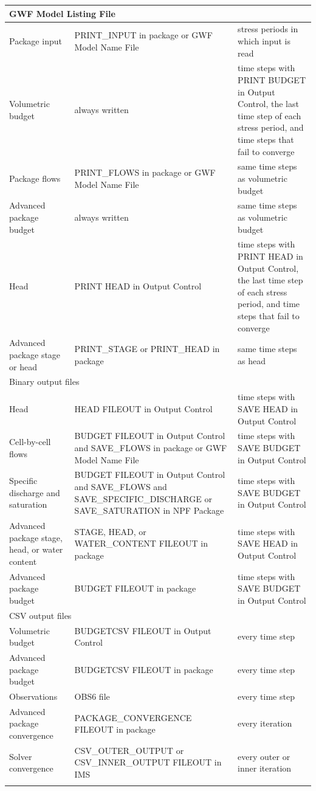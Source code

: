 \begin{longtable}{p{4.5cm} p{5cm} p{5.5cm}}
\multicolumn{3}{l}{GWF Model Listing File} \\
\hline
Package input & PRINT\_INPUT in package or GWF Model Name File & stress periods in which input is read \\
Volumetric budget & always written & time steps with PRINT BUDGET in Output Control, the last time step of each stress period, and time steps that fail to converge \\
Package flows & PRINT\_FLOWS in package or GWF Model Name File & same time steps as volumetric budget \\
Advanced package budget & always written & same time steps as volumetric budget \\
Head & PRINT HEAD in Output Control & time steps with PRINT HEAD in Output Control, the last time step of each stress period, and time steps that fail to converge \\
Advanced package stage or head & PRINT\_STAGE or PRINT\_HEAD in package & same time steps as head \\
\hline
\multicolumn{3}{l}{Binary output files} \\
\hline
Head & HEAD FILEOUT in Output Control & time steps with SAVE HEAD in Output Control \\
Cell-by-cell flows & BUDGET FILEOUT in Output Control and SAVE\_FLOWS in package or GWF Model Name File & time steps with SAVE BUDGET in Output Control \\
Specific discharge and saturation & BUDGET FILEOUT in Output Control and SAVE\_FLOWS and SAVE\_SPECIFIC\_DISCHARGE or SAVE\_SATURATION in NPF Package & time steps with SAVE BUDGET in Output Control \\
Advanced package stage, head, or water content & STAGE, HEAD, or WATER\_CONTENT FILEOUT in package & time steps with SAVE HEAD in Output Control \\
Advanced package budget & BUDGET FILEOUT in package & time steps with SAVE BUDGET in Output Control \\
\hline
\multicolumn{3}{l}{CSV output files} \\
\hline
Volumetric budget & BUDGETCSV FILEOUT in Output Control & every time step \\
Advanced package budget & BUDGETCSV FILEOUT in package & every time step \\
Observations & OBS6 file & every time step \\
Advanced package convergence & PACKAGE\_CONVERGENCE FILEOUT in package & every iteration \\
Solver convergence & CSV\_OUTER\_OUTPUT or CSV\_INNER\_OUTPUT FILEOUT in IMS & every outer or inner iteration \\
\label{table:outputsummary}
\end{longtable}

